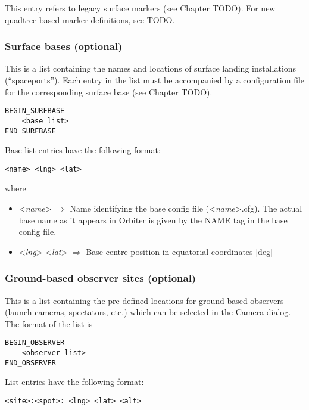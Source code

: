 \documentclass[Orbiter Developer Manual.tex]{subfiles}
\begin{document}
\noindent
This entry refers to legacy surface markers (see Chapter TODO). For new quadtree-based marker definitions, see TODO.


\subsubsection*{Surface bases (optional)}
This is a list containing the names and locations of surface landing installations (“spaceports”). Each entry in the list must be accompanied by a configuration file for the corresponding surface base (see Chapter TODO).

\begin{lstlisting}[language=OSFS]
BEGIN_SURFBASE
	<base list>
END_SURFBASE
\end{lstlisting}

\noindent
Base list entries have the following format:

\begin{lstlisting}[language=OSFS]
<name> <lng> <lat>
\end{lstlisting}

\noindent
where

\begin{itemize}
\item <\textit{name}> $\Rightarrow$ Name identifying the base config file (<\textit{name}>.cfg). The actual base name as it appears in Orbiter is given by the NAME tag in the base config file.
\item <\textit{lng}> <\textit{lat}> $\Rightarrow$ Base centre position in equatorial coordinates [deg]
\end{itemize}


\subsubsection*{Ground-based observer sites (optional)}
This is a list containing the pre-defined locations for ground-based observers (launch cameras, spectators, etc.) which can be selected in the Camera dialog. The format of the list is

\begin{lstlisting}[language=OSFS]
BEGIN_OBSERVER
	<observer list>
END_OBSERVER
\end{lstlisting}

\noindent
List entries have the following format:

\begin{lstlisting}[language=OSFS]
<site>:<spot>: <lng> <lat> <alt>
\end{lstlisting}
\end{document}
